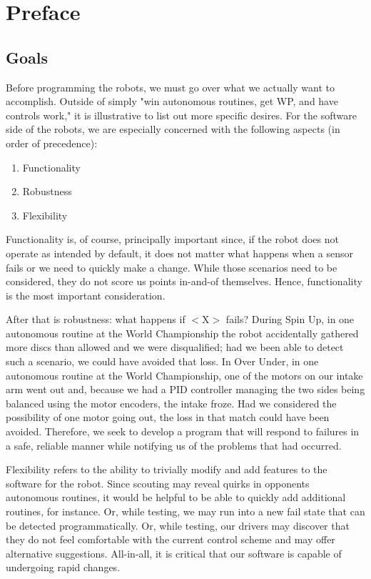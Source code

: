 \chapter{Preface}
\section{Goals}
Before programming the robots, we must go over what we actually want to accomplish. Outside of simply "win autonomous routines, get WP, and have controls work," it is illustrative to list out more specific desires. For the software side of the robots, we are especially concerned with the following aspects (in order of precedence):
\begin{enumerate}
    \item Functionality
    \item Robustness
    \item Flexibility
\end{enumerate}

Functionality is, of course, principally important since, if the robot does not operate as intended by default, it does not matter what happens when a sensor fails or we need to quickly make a change. While those scenarios need to be considered, they do not score us points in-and-of themselves. Hence, functionality is the most important consideration. 

After that is robustness: what happens if $<$X$>$ fails? During Spin Up, in one autonomous routine at the World Championship the robot accidentally gathered more discs than allowed and we were disqualified; had we been able to detect such a scenario, we could have avoided that loss. In Over Under, in one autonomous routine at the World Championship, one of the motors on our intake arm went out and, because we had a PID controller managing the two sides being balanced using the motor encoders, the intake froze. Had we considered the possibility of one motor going out, the loss in that match could have been avoided. Therefore, we seek to develop a program that will respond to failures in a safe, reliable manner while notifying us of the problems that had occurred. 

Flexibility refers to the ability to trivially modify and add features to the software for the robot. Since scouting may reveal quirks in opponents autonomous routines, it would be helpful to be able to quickly add additional routines, for instance. Or, while testing, we may run into a new fail state that can be detected programmatically. Or, while testing, our drivers may discover that they do not feel comfortable with the current control scheme and may offer alternative suggestions. All-in-all, it is critical that our software is capable of undergoing rapid changes. 

